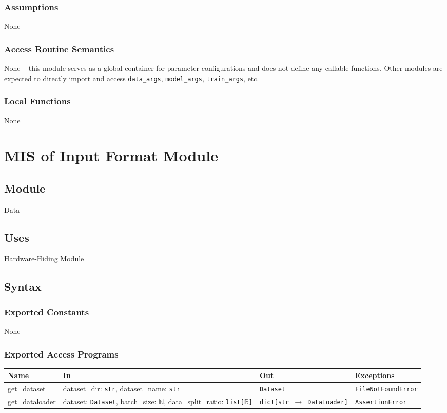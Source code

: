 \documentclass[12pt, titlepage]{article}
\begin{document}
\subsubsection{Assumptions}
None

\subsubsection{Access Routine Semantics}
None -- this module serves as a global container for parameter configurations and does not define any callable functions. Other modules are expected to directly import and access \texttt{data\_args}, \texttt{model\_args}, \texttt{train\_args}, etc.

\subsubsection{Local Functions}
None





\section{MIS of Input Format Module} \label{InputFormat}

\subsection{Module}
Data

\subsection{Uses}
Hardware-Hiding Module

\subsection{Syntax}

\subsubsection{Exported Constants}
None

\subsubsection{Exported Access Programs}

\begin{center}
\begin{tabular}{p{3.2cm} p{5.5cm} p{4cm} p{2.5cm}}
\hline
\textbf{Name} & \textbf{In} & \textbf{Out} & \textbf{Exceptions} \\
\hline
get\_dataset & dataset\_dir: \texttt{str}, dataset\_name: \texttt{str} & \texttt{Dataset} & \texttt{FileNotFoundError} \\
get\_dataloader & dataset: \texttt{Dataset}, batch\_size: \(\mathbb{N}\), data\_split\_ratio: \texttt{list[\(\mathbb{R}\)]} & \texttt{dict[str \(\rightarrow\) DataLoader]} & \texttt{AssertionError} \\
\hline
\end{tabular}
\end{center}
\end{document}
